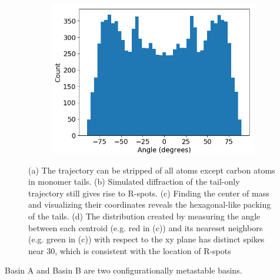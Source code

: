 \documentclass{article}
\begin{document}
\begin{figure}
\begin{subfigure}{0.45\textwidth}
		\caption{}\label{fig:centroids}
	\end{subfigure}
	\begin{subfigure}{0.45\textwidth}
		\centering
		\includegraphics[width=\textwidth]{angles_traj_layered.png}
		\caption{}\label{fig:angle_distribution}
	\end{subfigure}
	\caption{(a) The trajectory can be stripped of all atoms except carbon
	atoms in monomer tails. (b) Simulated diffraction of the tail-only trajectory
	still gives rise to R-spots. (c) Finding the center of mass and visualizing 
	their coordinates reveals the hexagonal-like packing of the tails. (d) The 
	distribution created by measuring the angle between each centroid (e.g. red 
	in (c)) and its neareset neighbors (e.g. green in (c)) with respect to the xy
	plane has distinct spikes near 30\degree, which is consistent with the location
	of R-spots}\label{fig:tail_packing}
  \end{figure}
  
  Basin A and Basin B are two configurationally metastable basins. 
  
\end{document}

